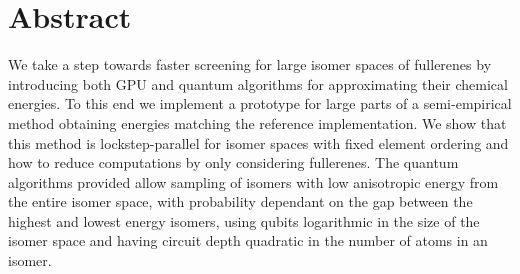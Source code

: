\chapter*{Abstract}
We take a step towards faster screening for large isomer spaces of fullerenes by introducing both GPU and quantum algorithms for approximating their chemical energies. To this end we implement a prototype for large parts of a semi-empirical method obtaining energies matching the reference implementation. We show that this method is lockstep-parallel for isomer spaces with fixed element ordering and how to reduce computations by only considering fullerenes. The quantum algorithms provided allow sampling of isomers with low anisotropic energy from the entire isomer space, with probability dependant on the gap between the highest and lowest energy isomers, using qubits logarithmic in the size of the isomer space and having circuit depth quadratic in the number of atoms in an isomer. 
